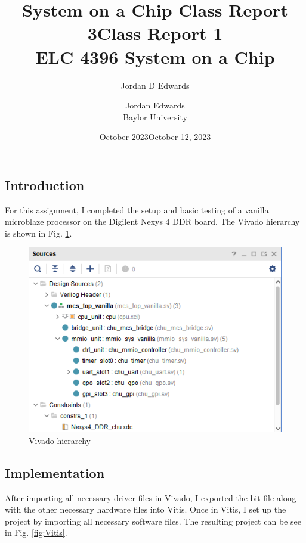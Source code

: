 \documentclass{article}
\title{System on a Chip Class Report 3}
\author{Jordan D Edwards}
\date{October 2023}
\begin{document}
	
	\title{Class Report 1
		\\ \large{ELC 4396 System on a Chip}  }
	
	\author{Jordan Edwards \\ Baylor University} %
	\date{October 12, 2023}
	\maketitle
	
	\subsection*{Introduction}
		For this assignment, I completed the setup and basic testing of a vanilla microblaze processor on the Digilent Nexys 4 DDR board. The Vivado hierarchy is shown in Fig. \ref{fig:Vivado}.
		
		\begin{figure}[H]
			\centering
			\includegraphics[width=0.7\linewidth]{"VivadoSC"}
			\caption{Vivado hierarchy}
			\label{fig:Vivado}
		\end{figure}
		
	
	\subsection*{Implementation}
		After importing all necessary driver files in Vivado, I exported the bit file along with the other necessary hardware files into Vitis. Once in Vitis, I set up the project by importing all necessary software files. The resulting project can be see in Fig. \ref{fig:Vitis}.
		
\end{document}
